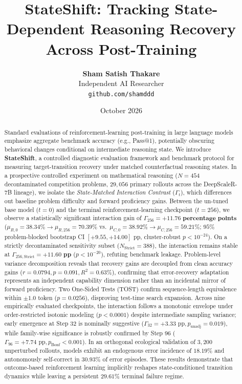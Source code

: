 \documentclass[11pt]{article}
\title{\textbf{StateShift: Tracking State-Dependent Reasoning Recovery\\Across Post-Training}}
\author{
  \textbf{Sham Satish Thakare} \\
  Independent AI Researcher \\
  \texttt{github.com/shamddd} \\
}
\date{October 2026}
\begin{document}
\maketitle

\begin{abstract}
Standard evaluations of reinforcement-learning post-training in large language models emphasize aggregate benchmark accuracy (e.g., Pass@1), potentially obscuring behavioral changes conditional on intermediate reasoning state. We introduce \textbf{StateShift}, a controlled diagnostic evaluation framework and benchmark protocol for measuring target-transition recovery under matched counterfactual reasoning states. In a prospective controlled experiment on mathematical reasoning ($N=454$ decontaminated competition problems, $29,056$ primary rollouts across the DeepScaleR-7B lineage), we isolate the \emph{State-Matched Interaction Contrast} ($\Gamma_t$), which differences out baseline problem difficulty and forward proficiency gains. Between the un-tuned base model ($t=0$) and the terminal reinforcement-learning checkpoint ($t=256$), we observe a statistically significant interaction gain of $\Gamma_{256} = \mathbf{+11.76\text{ percentage points}}$ ($\mu_{R,0}=38.34\% \to \mu_{R,256}=70.39\%$ vs.\ $\mu_{C,0}=38.92\% \to \mu_{C,256}=59.21\%$; $95\%$ problem-blocked bootstrap CI $[+9.55, +14.00]\text{ pp}$, cluster-robust $p < 10^{-24}$). On a strictly decontaminated sensitivity subset ($N_{\text{Strict}}=388$), the interaction remains stable at $\Gamma_{256,\text{Strict}} = \mathbf{+11.60\text{ pp}}$ ($p < 10^{-20}$), refuting benchmark leakage. Problem-level variance decomposition reveals that recovery gains are decoupled from clean accuracy gains ($r = 0.0794, p = 0.091, R^2 = 0.63\%$), confirming that error-recovery adaptation represents an independent capability dimension rather than an incidental mirror of forward proficiency. Two One-Sided Tests (TOST) confirm sequence-length equivalence within $\pm 1.0$ token ($p = 0.0256$), disproving test-time search expansion. Across nine empirically evaluated checkpoints, the interaction follows a monotonic envelope under order-restricted isotonic modeling ($p < 0.0001$) despite intermediate sampling variance; early emergence at Step 32 is nominally suggestive ($\Gamma_{32} = +3.33\text{ pp}, p_{\text{unadj}} = 0.019$), while family-wise significance is robustly confirmed by Step 96 ($\Gamma_{96} = +7.74\text{ pp}, p_{\text{Bonf}} < 0.001$). In an orthogonal ecological validation of $3,200$ unperturbed rollouts, models exhibit an endogenous error incidence of $18.19\%$ and autonomously self-correct in $30.93\%$ of error episodes. These results demonstrate that outcome-based reinforcement learning implicitly reshapes state-conditioned transition dynamics while leaving a persistent $29.61\%$ terminal failure regime.
\end{abstract}
\end{document}
